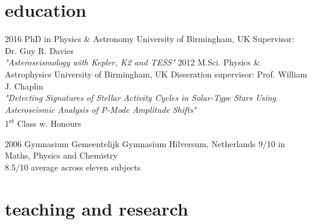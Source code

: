 \documentclass[]{k-cv} %
\begin{document}
\section{education}

\begin{entrylist}
\entry
{2016 }
{PhD {\normalfont in Physics \& Astronomy}}
{University of Birmingham, UK}
{Supervisor: Dr. Guy R. Davies\\
\emph{"Asteroseismology with \textit{Kepler}, K2 and TESS"} \vspace{0.2cm}}
\entry
{2012 }
{M.Sci. {\normalfont Physics \& Astrophysics}}
{University of Birmingham, UK}
{Disseration supervisor: Prof. William J. Chaplin\\
\emph{"Detecting Signatures of Stellar Activity Cycles in Solar-Type Stars Using Asteroseismic Analysis of P-Mode Amplitude Shifts"} \\ 
1\textsuperscript{st} Class w. Honours\vspace{0.2cm}}


\entry
{2006 }
{Gymnasium}
{Gemeentelijk Gymnasium Hilversum, Netherlands}
{9/10 in Maths, Physics and Chemistry\\
8.5/10 average across eleven subjects}
\end{entrylist}


\section{teaching and research}
\end{document}
